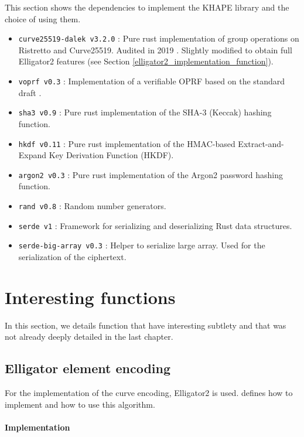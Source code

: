 \documentclass[../report.tex]{subfiles}
\begin{document}
This section shows the dependencies to implement the KHAPE library and the choice of using them.

\begin{itemize}
 \item \verb|curve25519-dalek v3.2.0| : Pure rust implementation of group operations on Ristretto and Curve25519. Audited in 2019 \cite{Curve25519_Dalek_Audit}. Slightly modified to obtain full Elligator2 features (see Section \ref{elligator2_implementation_function}).
 \item \verb|voprf v0.3| : Implementation of a verifiable OPRF based on the standard draft \cite{VOPRF_Standard_Draft}.
 \item \verb|sha3 v0.9| : Pure rust implementation of the SHA-3 (Keccak) hashing function.
 \item \verb|hkdf v0.11| : Pure rust implementation of the HMAC-based Extract-and-Expand Key Derivation Function (HKDF).
 \item \verb|argon2 v0.3| : Pure rust implementation of the Argon2 password hashing function.
\item \verb|rand v0.8| : Random number generators.
 \item \verb|serde v1| : Framework for serializing and deserializing Rust data structures.
 \item \verb|serde-big-array v0.3| : Helper to serialize large array. Used for the serialization of the ciphertext.
\end{itemize}




\section{Interesting functions}

In this section, we details function that have interesting subtlety and that was not already deeply detailed in the last chapter.

\subsection{Elligator element encoding} \label{sec:elligator2_implementation_function}

For the implementation of the curve encoding, Elligator2 is used.
\cite{Elligator2_Paper} defines how to implement and how to use this algorithm.

\paragraph{Implementation}
\end{document}
